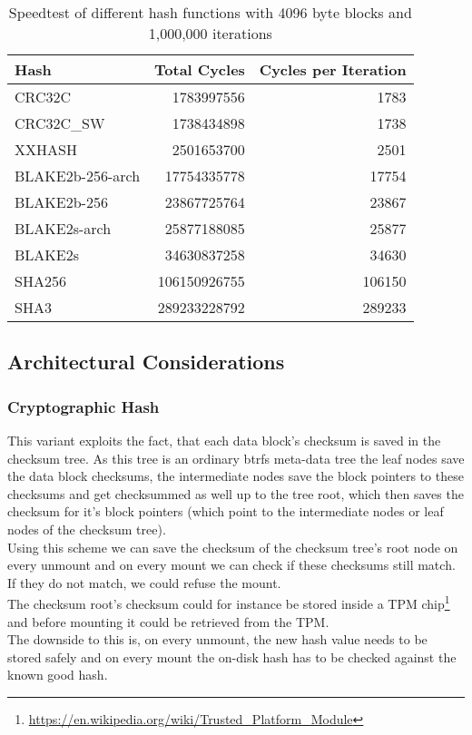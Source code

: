 \documentclass[10pt]{article}
\begin{document}
\begin{table}
	\centering
	\begin{tabular}{l | r | r } 
		Hash & Total Cycles & Cycles per Iteration \\	
		\hline
		CRC32C & 1783997556 & 1783 \\
		CRC32C\_SW & 1738434898 & 1738 \\
		XXHASH & 2501653700 & 2501 \\
		BLAKE2b-256-arch & 17754335778 & 17754 \\
		BLAKE2b-256 & 23867725764 & 23867 \\
		BLAKE2s-arch & 25877188085 & 25877 \\
		BLAKE2s & 34630837258 & 34630 \\
		SHA256 & 106150926755 & 106150 \\
		SHA3 & 289233228792 & 289233 \\
		\hline
	\end{tabular}
	\caption{Speedtest of different hash functions with 4096 byte blocks
	and 1,000,000 iterations}
	\label{tab:hash-speed}
\end{table}

\subsection{Architectural Considerations}
\subsubsection{Cryptographic Hash}
This variant exploits the fact, that each data block's checksum is saved in
the checksum tree. As this tree is an ordinary btrfs meta-data tree the leaf
nodes save the data block checksums, the intermediate nodes save the block
pointers to these checksums and get checksummed as well up to the tree root,
which then saves the checksum for it's block pointers (which point to the
intermediate nodes or leaf nodes of the checksum tree). \\ Using this scheme
we can save the checksum of the checksum tree's root node on every unmount and
on every mount we can check if these checksums still match. If they do not
match, we could refuse the mount.\\ The checksum root's checksum could for
instance be stored inside a TPM
chip\footnote{\href{https://en.wikipedia.org/wiki/Trusted\_Platform\_Module}
{https://en.wikipedia.org/wiki/Trusted\_Platform\_Module}} and before mounting
it could be retrieved from the TPM.\\ The downside to this is, on every
unmount, the new hash value needs to be stored safely and on every mount the
on-disk hash has to be checked against the known good hash.
\end{document}
